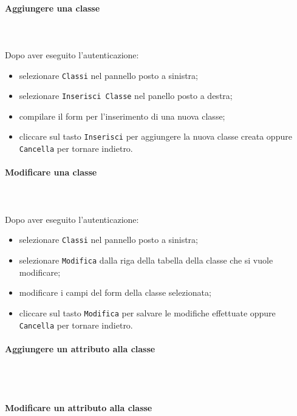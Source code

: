 \paragraph{Aggiungere una classe} \mbox{}\\ \mbox{}\\
Dopo aver eseguito l'autenticazione:
\begin{itemize}
	\item selezionare \texttt{Classi} nel pannello posto a sinistra;
	\item selezionare \texttt{Inserisci Classe} nel panello posto a destra;
	\item compilare il form per l'inserimento di una nuova classe;
	\item cliccare sul tasto \texttt{Inserisci} per aggiungere la nuova classe 
		creata oppure \texttt{Cancella} per tornare indietro.	
\end{itemize}

\paragraph{Modificare una classe} \mbox{}\\ \mbox{}\\
Dopo aver eseguito l'autenticazione:
\begin{itemize}
	\item selezionare \texttt{Classi} nel pannello posto a sinistra;
	\item selezionare \texttt{Modifica} dalla riga della tabella della classe
		che si vuole modificare;
	\item modificare i campi del form della classe selezionata;
	\item cliccare sul tasto \texttt{Modifica} per salvare le modifiche effettuate
		oppure \texttt{Cancella} per tornare indietro.
\end{itemize}


\paragraph{Aggiungere un attributo alla classe} \mbox{}\\ \mbox{}\\

\paragraph{Modificare un attributo alla classe} \mbox{}\\ \mbox{}\\


